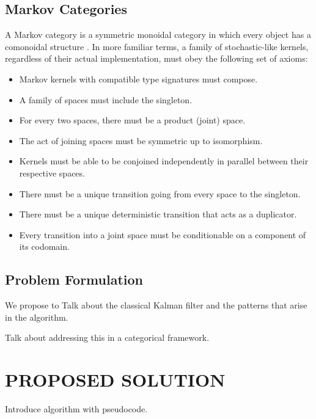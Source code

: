 \documentclass[letterpaper, 10 pt, conference]{ieeeconf}  %
\begin{document}
\subsection{Markov Categories}
A Markov category is a symmetric monoidal category in which every object has a comonoidal structure \cite{fritz}.
In more familiar terms, a family of stochastic-like kernels, regardless of their actual implementation, must obey the following set of axioms:

\begin{itemize}
    \item Markov kernels with compatible type signatures must compose.
    \item A family of spaces must include the singleton.
    \item For every two spaces, there must be a product (joint) space.
    \item The act of joining spaces must be symmetric up to isomorphism.
    \item Kernels must be able to be conjoined independently in parallel between their respective spaces.
    \item There must be a unique transition going from every space to the singleton.
    \item There must be a unique deterministic transition that acts as a duplicator.
    \item Every transition into a joint space must be conditionable on a component of its codomain.
\end{itemize}

\subsection{Problem Formulation}

We propose to 
Talk about the classical Kalman filter and the patterns that arise in the algorithm.

Talk about addressing this in a categorical framework.

\section{PROPOSED SOLUTION}

Introduce algorithm with pseudocode.
\end{document}
